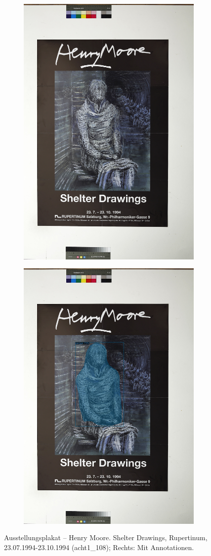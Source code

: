 \documentclass[a4paper,12pt,ngerman]{article}
\begin{document}
\newpage
\begin{landscape}
\begin{figure}[ht]
	\begin{subfigure}[b]{0.5\linewidth}
	\centering
	\includegraphics[height=\linewidth]{Abbildung_38_(acht1_108)}
	\end{subfigure}
	\begin{subfigure}[b]{0.5\linewidth}
	\centering
	\includegraphics[height=\linewidth]{Abbildung_38_(acht1_108)_with_detections}
	\end{subfigure}
	\caption{Ausstellungsplakat – Henry Moore. Shelter Drawings, Rupertinum, 23.07.1994-23.10.1994 (acht1\_108); Rechts: Mit Annotationen.}
\end{figure}
\end{landscape}
\end{document}
